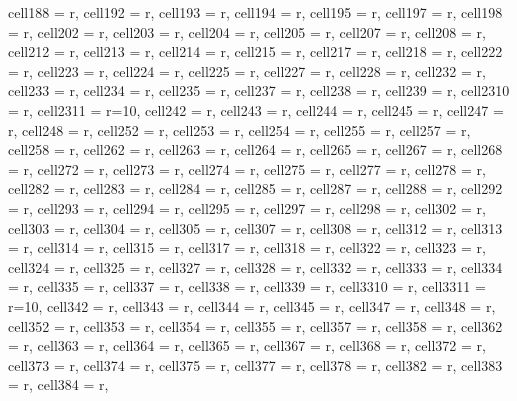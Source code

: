 \begin{longtblr}[
  caption = {Linear model estimating all the considered metrics in every alternative scenario.},
  label = {tab:appendix_LCBM_all_metrics_all_scenarios}
]
{  cell{18}{8} = {r},
  cell{19}{2} = {r},
  cell{19}{3} = {r},
  cell{19}{4} = {r},
  cell{19}{5} = {r},
  cell{19}{7} = {r},
  cell{19}{8} = {r},
  cell{20}{2} = {r},
  cell{20}{3} = {r},
  cell{20}{4} = {r},
  cell{20}{5} = {r},
  cell{20}{7} = {r},
  cell{20}{8} = {r},
  cell{21}{2} = {r},
  cell{21}{3} = {r},
  cell{21}{4} = {r},
  cell{21}{5} = {r},
  cell{21}{7} = {r},
  cell{21}{8} = {r},
  cell{22}{2} = {r},
  cell{22}{3} = {r},
  cell{22}{4} = {r},
  cell{22}{5} = {r},
  cell{22}{7} = {r},
  cell{22}{8} = {r},
  cell{23}{2} = {r},
  cell{23}{3} = {r},
  cell{23}{4} = {r},
  cell{23}{5} = {r},
  cell{23}{7} = {r},
  cell{23}{8} = {r},
  cell{23}{9} = {r},
  cell{23}{10} = {r},
  cell{23}{11} = {r=10}{},
  cell{24}{2} = {r},
  cell{24}{3} = {r},
  cell{24}{4} = {r},
  cell{24}{5} = {r},
  cell{24}{7} = {r},
  cell{24}{8} = {r},
  cell{25}{2} = {r},
  cell{25}{3} = {r},
  cell{25}{4} = {r},
  cell{25}{5} = {r},
  cell{25}{7} = {r},
  cell{25}{8} = {r},
  cell{26}{2} = {r},
  cell{26}{3} = {r},
  cell{26}{4} = {r},
  cell{26}{5} = {r},
  cell{26}{7} = {r},
  cell{26}{8} = {r},
  cell{27}{2} = {r},
  cell{27}{3} = {r},
  cell{27}{4} = {r},
  cell{27}{5} = {r},
  cell{27}{7} = {r},
  cell{27}{8} = {r},
  cell{28}{2} = {r},
  cell{28}{3} = {r},
  cell{28}{4} = {r},
  cell{28}{5} = {r},
  cell{28}{7} = {r},
  cell{28}{8} = {r},
  cell{29}{2} = {r},
  cell{29}{3} = {r},
  cell{29}{4} = {r},
  cell{29}{5} = {r},
  cell{29}{7} = {r},
  cell{29}{8} = {r},
  cell{30}{2} = {r},
  cell{30}{3} = {r},
  cell{30}{4} = {r},
  cell{30}{5} = {r},
  cell{30}{7} = {r},
  cell{30}{8} = {r},
  cell{31}{2} = {r},
  cell{31}{3} = {r},
  cell{31}{4} = {r},
  cell{31}{5} = {r},
  cell{31}{7} = {r},
  cell{31}{8} = {r},
  cell{32}{2} = {r},
  cell{32}{3} = {r},
  cell{32}{4} = {r},
  cell{32}{5} = {r},
  cell{32}{7} = {r},
  cell{32}{8} = {r},
  cell{33}{2} = {r},
  cell{33}{3} = {r},
  cell{33}{4} = {r},
  cell{33}{5} = {r},
  cell{33}{7} = {r},
  cell{33}{8} = {r},
  cell{33}{9} = {r},
  cell{33}{10} = {r},
  cell{33}{11} = {r=10}{},
  cell{34}{2} = {r},
  cell{34}{3} = {r},
  cell{34}{4} = {r},
  cell{34}{5} = {r},
  cell{34}{7} = {r},
  cell{34}{8} = {r},
  cell{35}{2} = {r},
  cell{35}{3} = {r},
  cell{35}{4} = {r},
  cell{35}{5} = {r},
  cell{35}{7} = {r},
  cell{35}{8} = {r},
  cell{36}{2} = {r},
  cell{36}{3} = {r},
  cell{36}{4} = {r},
  cell{36}{5} = {r},
  cell{36}{7} = {r},
  cell{36}{8} = {r},
  cell{37}{2} = {r},
  cell{37}{3} = {r},
  cell{37}{4} = {r},
  cell{37}{5} = {r},
  cell{37}{7} = {r},
  cell{37}{8} = {r},
  cell{38}{2} = {r},
  cell{38}{3} = {r},
  cell{38}{4} = {r},
}
\end{longtblr}
